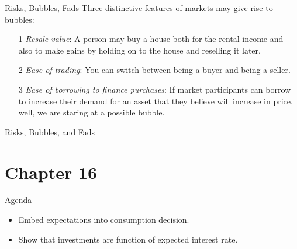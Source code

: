 \documentclass[shownotes,11pt, aspectratio=169]{beamer}
\begin{document}
\begin{frame}{Risks, Bubbles, Fads}
Three distinctive features of markets may give rise to bubbles:
\begin{itemize}
\item[1] \textit{Resale value}: A person may buy a house both for the rental income and also to make gains by holding on to the house and reselling it later.
\item[2] \textit{Ease of trading}:  You can switch between being a buyer and being a seller.
\item[3] \textit{Ease of borrowing to finance purchases}: If market participants can borrow to increase their demand for an asset that they believe will increase in price, well, we are staring at a possible bubble.
\end{itemize}
\end{frame}

\begin{frame}{Risks, Bubbles, and Fads}
\end{frame}

\section{Chapter 16}

\begin{frame}{Agenda}
\begin{itemize}
\item Embed expectations into consumption decision.
\item Show that investments are function of expected interest rate.
\end{itemize}
\end{frame}
\end{document}
